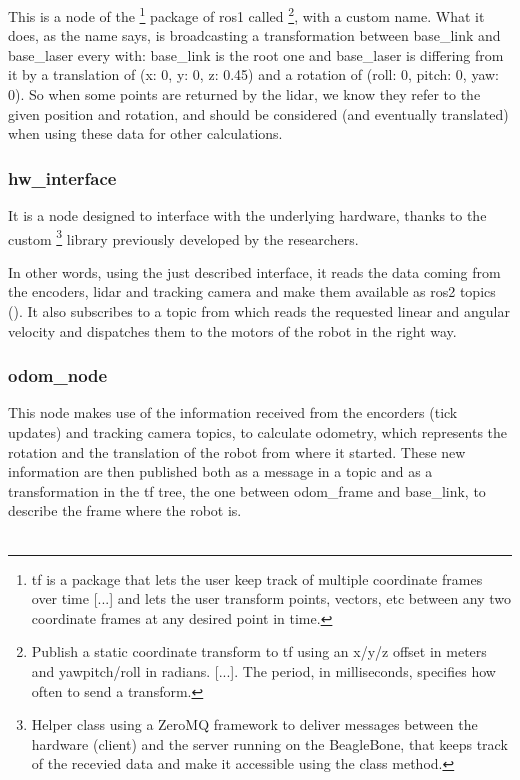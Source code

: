 This is a node of the \footnote{tf is a package that lets the user keep track of multiple coordinate frames over time [...] and lets the user transform points, vectors, etc between any two coordinate frames at any desired point in time.\cite{tf}} package of \Acrshort{ros}1 called \footnote{Publish a static coordinate transform to tf using an x/y/z offset in meters and yaw\/pitch/roll in radians. [...]. The period, in milliseconds, specifies how often to send a transform.}, with a custom name. What it does, as the name says, is broadcasting a transformation between base\_link and base\_laser every  with: base\_link is the root one and base\_laser is differing from it by a translation of (x: 0, y: 0, z: 0.45) and a rotation of (roll: 0, pitch: 0, yaw: 0). So when some points are returned by the lidar, we know they refer to the given position and rotation, and should be considered (and eventually translated) when using these data for other calculations.

\subsubsection{hw\_interface}

It is a node designed to interface with the underlying hardware, thanks to the custom \footnote{Helper class using a ZeroMQ framework to deliver messages between the hardware (client) and the server running on the BeagleBone, that keeps track of the recevied data and make it accessible using the class method.} library previously developed by the researchers.

In other words, using the just described interface, it reads the data coming from the encoders, lidar and tracking camera and make them available as \Acrshort{ros}2 topics (). It also subscribes to a  topic from which reads the requested linear and angular velocity and dispatches them to the motors of the robot in the right way.

\subsubsection{odom\_node}

This node makes use of the information received from the encorders (tick updates) and tracking camera topics, to calculate odometry, which represents the rotation and the translation of the robot from where it started. These new information are then published both as a message in a topic and as a transformation in the tf tree, the one between odom\_frame and base\_link, to describe the frame where the robot is. \\\\